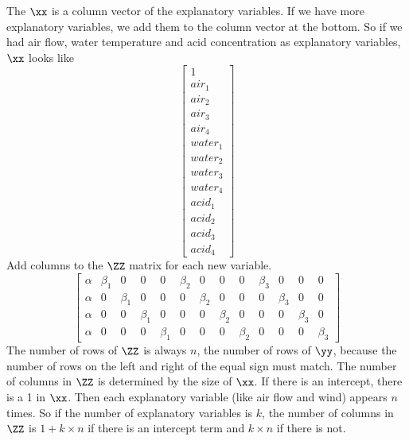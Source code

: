 The $\xx$ is a column vector of the explanatory variables. If we have more explanatory variables, we add them to the column vector at the bottom.  So if we had air flow, water temperature and acid concentration as explanatory variables, $\xx$ looks like
\begin{equation}\label{eqn:ss2.form2}
\begin{bmatrix}1 \\ air_1 \\ air_2 \\ air_3 \\ air_4 \\ water_1 \\ water_2 \\ water_3 \\ water_4 \\ acid_1 \\ acid_2 \\ acid_3 \\ acid_4 \end{bmatrix}
\end{equation}
Add columns to the  $\ZZ$ matrix for each new variable.
\begin{equation}
\begin{bmatrix}
\alpha & \beta_1 & 0 & 0 & 0 & \beta_2 & 0 & 0 & 0 & \beta_3 & 0 & 0 & 0\\
\alpha & 0 & \beta_1 & 0 & 0 & 0 & \beta_2 & 0 & 0 & 0 & \beta_3 & 0 & 0\\
\alpha&0&0&\beta_1&0&0&0&\beta_2&0&0&0&\beta_3&0\\
\alpha&0&0&0&\beta_1&0&0&0&\beta_2&0&0&0&\beta_3
\end{bmatrix}
\end{equation}
The number of rows of $\ZZ$ is always $n$, the number of rows of $\yy$, because the number of rows on the left and right of the equal sign must match.  The number of columns in $\ZZ$ is determined by the size of $\xx$.  If there is an intercept, there is a 1 in $\xx$.  Then each explanatory variable (like air flow and wind) appears $n$ times.  So if the number of explanatory variables is $k$, the number of columns in $\ZZ$ is $1+k \times n$ if there is an intercept term and $k \times n$ if there is not.

